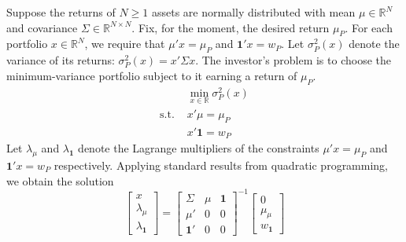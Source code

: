 \documentclass[12pt]{article}
\begin{document}
	\onehalfspacing
	Suppose the returns of $N\geq1$ assets are normally distributed with mean $\mu\in\mathbb{R}^{N}$ and covariance $\Sigma\in\mathbb{R}^{N\times N}$. Fix, for the moment, the desired return $\mu_{P}$. For each portfolio $x\in\mathbb{R}^{N}$, we require that $\mu'x=\mu_{P}$ and $\mathbf{1}'x=w_{P}$. Let $\sigma_{P}^{2}(x)$ denote the variance of its returns: $\sigma_{P}^{2}(x)=x'\Sigma x$. The investor's problem is to choose the minimum-variance portfolio subject to it earning a return of $\mu_{P}$. 
\begin{equation}
	\begin{array}{rl}
		&\min_{x\in\mathbb{R}}\sigma_{P}^{2}(x)\\
		\text{s.t. }&x'\mu=\mu_{P}\\
		&x'\mathbf{1}=w_{P}
	\end{array}
\end{equation}
Let $\lambda_{\mu}$ and $\lambda_{\mathbf{1}}$ denote the Lagrange multipliers of the constraints $\mu'x=\mu_{P}$ and $\mathbf{1}'x=w_{P}$ respectively. Applying standard results from quadratic programming, we obtain the solution 
\begin{equation}
\left[
\begin{array}{c}
x \\
\lambda_{\mu}\\
\lambda_{\mathbf{1}}
\end{array}
\right]
=
\left[
\begin{array}{ccc}
\Sigma & \mu & \mathbf{1} \\
\mu' & 0 & 0 \\
\mathbf{1}' & 0 & 0
\end{array}
\right]^{-1}
\left[
\begin{array}{c}
0 \\
\mu_{\mu}\\
w_{\mathbf{1}}
\end{array}
\right]
\end{equation}
\end{document}
